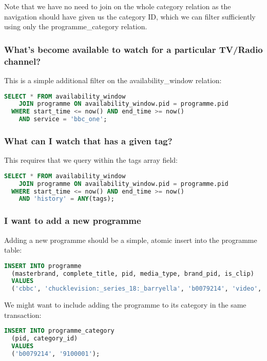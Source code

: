 \documentclass[11pt,a4paper]{article}
\begin{document}
Note that we have no need to join on the whole category relation as the
navigation should have given us the category ID, which we can filter
sufficiently using only the programme\_category relation.

\subsubsection{What's become available to watch for a particular TV/Radio channel?}

This is a simple additional filter on the availability\_window relation:

\begin{lstlisting}[language=SQL]
  SELECT * FROM availability_window
    JOIN programme ON availability_window.pid = programme.pid
  WHERE start_time <= now() AND end_time >= now()
    AND service = 'bbc_one';
\end{lstlisting}

\subsubsection{What can I watch that has a given tag?}

This requires that we query within the tags array field:

\begin{lstlisting}[language=SQL]
  SELECT * FROM availability_window
    JOIN programme ON availability_window.pid = programme.pid
  WHERE start_time <= now() AND end_time >= now()
    AND 'history' = ANY(tags);
\end{lstlisting}

\subsubsection{I want to add a new programme}

Adding a new programme should be a simple, atomic insert into the programme
table:

\begin{lstlisting}[language=SQL]
  INSERT INTO programme
  (masterbrand, complete_title, pid, media_type, brand_pid, is_clip)
  VALUES
  ('cbbc', 'chucklevision:_series_18:_barryella', 'b0079214', 'video', 'b006w487', '0');
\end{lstlisting}

We might want to include adding the programme to its category in the same
transaction:

\begin{lstlisting}[language=SQL]
  INSERT INTO programme_category
  (pid, category_id)
  VALUES
  ('b0079214', '9100001');
\end{lstlisting}
\end{document}
